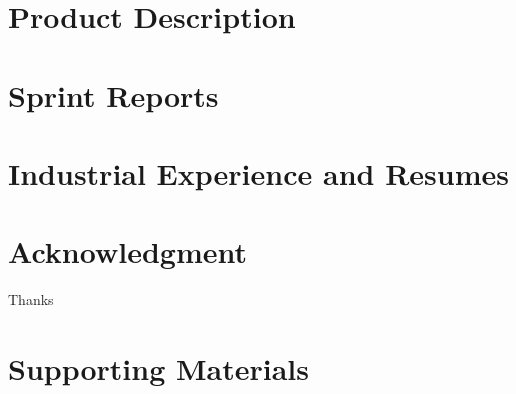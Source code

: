 \documentclass{book}
\begin{document}
\appendix

\chapter{Product Description}



\chapter{Sprint Reports}


\chapter{Industrial Experience and Resumes}


\chapter{Acknowledgment}
\label{SpecialThanks}  
Thanks  

\chapter{Supporting Materials}


\backmatter

%

\end{document}
